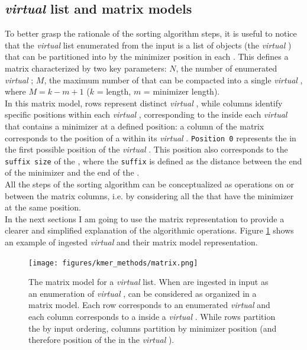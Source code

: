 \subsection{\emph{virtual} \skmer list and \kmer matrix models}
\label{sec:skmer_model}
To better grasp the rationale of the sorting algorithm steps, it is useful to notice that the \emph{virtual} \skmer list enumerated from the input is a list of objects (the \emph{virtual} \skmers) that can be partitioned into \kmer by the minimizer position in each \kmer. This defines a \kmer matrix characterized by two key parameters: $N$, the number of enumerated \emph{virtual} \skmers; $M$, the maximum number of \kmers that can be compacted into a single \emph{virtual} \skmer, where $M = k-m+1$ ($k$ = \kmer length, $m$ = minimizer length).\\
In this matrix model, rows represent distinct \emph{virtual} \skmers, while columns identify specific positions within each \emph{virtual} \skmer, corresponding to the \kmer inside each \emph{virtual} \skmer that contains a minimizer at a defined position: a column of the matrix corresponds to the position of a \kmer within its \emph{virtual} \skmer. \texttt{Position 0} represents the \kmer in the first possible position of the \emph{virtual} \skmer. This position also corresponds to the \texttt{suffix size} of the \kmer, where the \texttt{suffix} is defined as the distance between the end of the minimizer and the end of the \kmer.\\
All the steps of the sorting algorithm can be conceptualized as operations on or between the matrix columns, i.e. by considering all the \kmers that have the minimizer at the same position. \\
In the next sections I am going to use the matrix representation to provide a clearer and simplified explanation of the algorithmic operations. Figure \ref{fig:matrix} shows an example of ingested \emph{virtual} \skmers and their matrix model representation.

\begin{figure}[H]
	\centering
	\texttt{[image: figures/kmer\_methods/matrix.png]}
	\caption[The matrix model for a \emph{virtual} \skmer list.]{The matrix model for a \emph{virtual} \skmer list. When \kmers are ingested in input as an enumeration of \emph{virtual} \skmer, \kmers can be considered as organized in a matrix model. Each row corresponds to an enumerated \emph{virtual} \skmer and each column corresponds to a \kmer inside a \emph{virtual} \skmer. While rows partition the \kmers by input ordering, columns partition \kmers by minimizer position (and therefore position of the \kmer in the \emph{virtual} \skmer).}
	\label{fig:matrix}
\end{figure}

